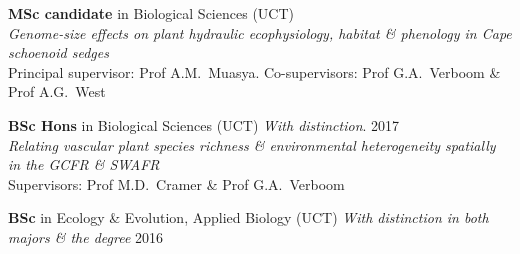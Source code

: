 \begin{hangparas}{2em}{1}

\textbf{MSc candidate} in Biological Sciences {\small (UCT)}              \\
\hspace{2em} \textit{Genome-size effects on plant
  hydraulic ecophysiology, habitat \& phenology in
  Cape schoenoid sedges}                                                  \\
\hspace{2em} Principal supervisor: Prof A.M.~Muasya.
  Co-supervisors:
  Prof G.A.~Verboom \&
  Prof A.G.~West

\textbf{BSc Hons} in Biological Sciences {\small
  (UCT) \textit{With distinction}}.                  \hfill {\small 2017} \\
\hspace{2em} \textit{Relating vascular plant species
  richness \& environmental heterogeneity spatially
  in the GCFR \& SWAFR}                                                   \\
\hspace{2em} Supervisors:
  Prof M.D.~Cramer \&
  Prof G.A.~Verboom

\textbf{BSc} in Ecology \& Evolution, Applied
  Biology {\small (UCT) \textit{With distinction in
  both majors \& the degree}}                        \hfill {\small 2016}

\end{hangparas}
